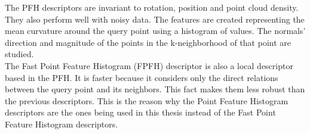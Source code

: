 The PFH descriptors are invariant to rotation, position and point cloud density. 
They also perform well with noisy data. 
The features are created representing the mean curvature around the query point using a histogram of values. 
The normals' direction and magnitude of the points in the k-neighborhood of that point are studied. 
\\

The Fast Point Feature Histogram (FPFH) \cite{Rusu} descriptor is also a local descriptor based in the PFH. 
It is faster because it considers only the direct relations between the query point and its neighbors.
This fact makes them less robust than the previous descriptors. 
This is the reason why the Point Feature Histogram descriptors are the ones being used in this thesis instead of the Fast Point Feature Histogram descriptors. 
